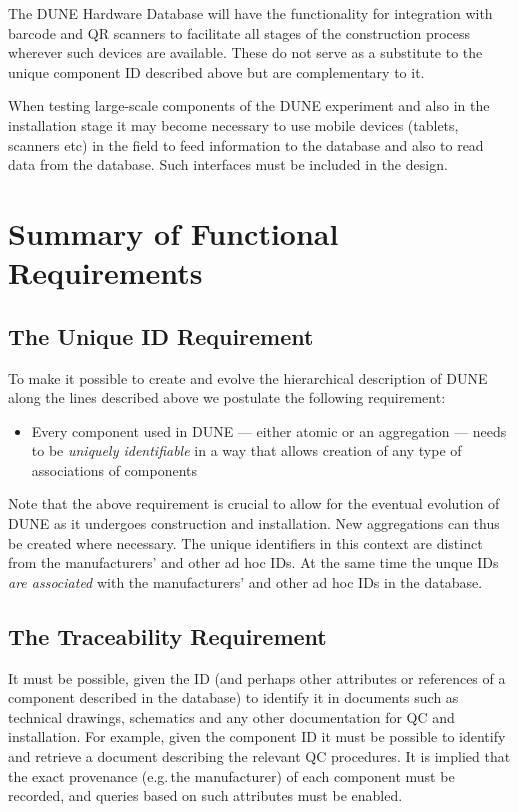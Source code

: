 \documentclass[pdftex,12pt,letter]{article}
\begin{document}
The DUNE Hardware Database will have the functionality for integration with barcode and QR scanners to facilitate
all stages of the construction process wherever such devices are available. These do not serve as a substitute to the
unique component ID described above but are complementary to it.

When testing large-scale components of the DUNE experiment and also in the installation stage
it may become necessary to use mobile devices (tablets, scanners etc) in the field to feed information to the database
and also to read data from the database. Such interfaces must be included in the design.

\section{Summary of Functional Requirements}


\subsection{The Unique ID Requirement}

To make it possible to create and evolve the hierarchical description of DUNE along the lines described above
we postulate the following requirement:

\begin{itemize}

\item Every component used in DUNE ---  either atomic or an aggregation --- needs to be \textit{uniquely identifiable} in a way that allows
creation of any type of associations of components

\end{itemize}


\noindent Note that the above requirement is crucial to allow for the eventual evolution of DUNE as it undergoes construction and installation.
New aggregations can thus be created where necessary. The unique identifiers in this context are distinct from the manufacturers' and other ad hoc IDs.
At the same time the unque IDs \textit{are associated} with the manufacturers' and other ad hoc IDs in the database.


\subsection{The Traceability Requirement}

It must be possible, given the ID (and perhaps other attributes or references of a component described in the database)
to identify it in documents such as technical drawings, schematics and any other documentation for QC and installation.
For example, given the component ID it must be possible to identify and retrieve a document describing the relevant QC
procedures. It is implied that the exact provenance (e.g.\,the manufacturer) of each component must be recorded, and
queries based on such attributes must be enabled.
\end{document}
